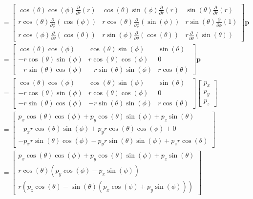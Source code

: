 \documentclass[titlepage]{article}
\begin{document}
\begin{equation}
\begin{split}
		&=
		\begin{bmatrix}
			\cos(\theta)\cos(\phi)\frac{\partial}{\partial r}\left(r\right) & \cos(\theta)\sin(\phi)\frac{\partial}{\partial r}\left(r\right) & \sin(\theta)\frac{\partial}{\partial r}\left(r\right) \\
			r\cos(\theta)\frac{\partial}{\partial\phi}\left(\cos(\phi)\right) & r\cos(\theta)\frac{\partial}{\partial\phi}\left(\sin(\phi)\right) & r\sin(\theta)\frac{\partial}{\partial\phi}\left(1\right) \\
			r\cos(\phi)\frac{\partial}{\partial\theta}\left(\cos(\theta)\right) & r\sin(\phi)\frac{\partial}{\partial\theta}\left(\cos(\theta)\right) & r\frac{\partial}{\partial\theta}\left(\sin(\theta)\right)
		\end{bmatrix}\boldsymbol{p} \\
		&=
		\begin{bmatrix}
			\cos(\theta)\cos(\phi) & \cos(\theta)\sin(\phi) & \sin(\theta) \\
			-r\cos(\theta)\sin(\phi) & r\cos(\theta)\cos(\phi) & 0 \\
			-r\sin(\theta)\cos(\phi) & -r\sin(\theta)\sin(\phi) & r\cos(\theta)
		\end{bmatrix}\boldsymbol{p} \\
		&=
		\begin{bmatrix}
			\cos(\theta)\cos(\phi) & \cos(\theta)\sin(\phi) & \sin(\theta) \\
			-r\cos(\theta)\sin(\phi) & r\cos(\theta)\cos(\phi) & 0 \\
			-r\sin(\theta)\cos(\phi) & -r\sin(\theta)\sin(\phi) & r\cos(\theta)
		\end{bmatrix}
		\begin{bmatrix}
			p_x \\
			p_y \\
			p_z
		\end{bmatrix} \\
		&=
		\begin{bmatrix}
			p_x\cos(\theta)\cos(\phi)+p_y\cos(\theta)\sin(\phi)+p_z\sin(\theta) \\
			-p_xr\cos(\theta)\sin(\phi)+p_yr\cos(\theta)\cos(\phi)+0 \\
			-p_xr\sin(\theta)\cos(\phi)-p_yr\sin(\theta)\sin(\phi)+p_zr\cos(\theta)
		\end{bmatrix} \\
		&=
		\begin{bmatrix}
			p_x\cos(\theta)\cos(\phi)+p_y\cos(\theta)\sin(\phi)+p_z\sin(\theta) \\
			r\cos(\theta)\left(p_y\cos(\phi)-p_x\sin(\phi)\right) \\
			r\left(p_z\cos(\theta)-\sin(\theta)\left(p_x\cos(\phi)+p_y\sin(\phi)\right)\right)
		\end{bmatrix}
	\end{split}
	\label{eq:momentumevaluation}
\end{equation}
\end{document}

